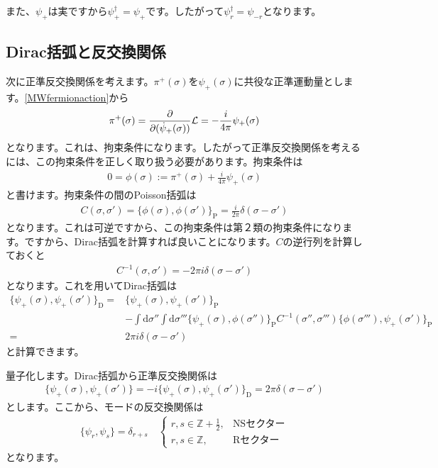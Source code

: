 \documentclass[report,paper=a4, fontsize=12pt, line_length=16cm, number_of_lines=34,dvipdfmx]{jlreq}
\numberwithin{equation}{chapter}
\numberwithin{equation}{section}
\newcommand{\Zb}{\mathbb{Z}}
\newcommand{\Lcal}{\mathcal{L}}
\newcommand{\pbk}[1]{\{#1\}_{\mathrm{P}}}
\newcommand{\dbk}[1]{\{#1\}_{\mathrm{D}}}
\newcommand{\di}{\mathrm{d}}
\begin{document}
また、$\psi_{+}$は実ですから$\psi_{+}^{\dag}=\psi_{+}$です。したがって$\psi_{r}^{\dag}=\psi_{-r}$となります。

\subsection{Dirac括弧と反交換関係}
次に正準反交換関係を考えます。$\pi^{+}(\sigma)$を$\psi_{+}(\sigma)$に共役な正準運動量とします。\eqref{MWfermionaction}から
\begin{align}
  \pi^{+}(\sigma)=\pdv{(\dot{\psi}_{+}(\sigma))}\Lcal=-\frac{i}{4\pi}\psi_{+}(\sigma)
\end{align}
となります。これは、拘束条件になります。したがって正準反交換関係を考えるには、この拘束条件を正しく取り扱う必要があります。拘束条件は
\begin{align}
  0=\phi(\sigma):=\pi^{+}(\sigma)+\frac{i}{4\pi}\psi_{+}(\sigma)
\end{align}
と書けます。拘束条件の間のPoisson括弧は
\begin{align}
  C(\sigma,\sigma')=\pbk{\phi(\sigma),\phi(\sigma')}=\frac{i}{2\pi}\delta(\sigma-\sigma')
\end{align}
となります。これは可逆ですから、この拘束条件は第２類の拘束条件になります。ですから、Dirac括弧を計算すれば良いことになります。$C$の逆行列を計算しておくと
\begin{align}
  C^{-1}(\sigma,\sigma')=-2\pi i\delta(\sigma-\sigma')
\end{align}
となります。これを用いてDirac括弧は
\begin{align}
  \dbk{\psi_{+}(\sigma),\psi_{+}(\sigma')}
  =&\pbk{\psi_{+}(\sigma),\psi_{+}(\sigma')}\nonumber \\
   &-\int \di\sigma''\int \di \sigma'''
   \pbk{\psi_{+}(\sigma),\phi(\sigma'')}C^{-1}(\sigma'',\sigma''')\pbk{\phi(\sigma'''),\psi_{+}(\sigma')}\nonumber\\
   =&2\pi i \delta(\sigma-\sigma')
\end{align}
と計算できます。

量子化します。Dirac括弧から正準反交換関係は
\begin{align}
  \{\psi_{+}(\sigma),\psi_{+}(\sigma')\}
  =-i\dbk{\psi_{+}(\sigma),\psi_{+}(\sigma')}
  =2\pi \delta(\sigma-\sigma')
\end{align}
とします。ここから、モードの反交換関係は
\begin{align}
  \{\psi_{r},\psi_{s}\}=\delta_{r+s}\quad
  \begin{cases}
    r,s\in \Zb+\frac12,&\text{NSセクター}\\
    r,s\in \Zb,&\text{Rセクター}
  \end{cases}
  \label{anticomm}
\end{align}
となります。
\end{document}
